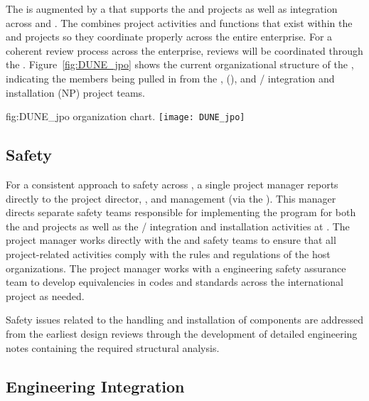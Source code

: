 The  is augmented by a  that supports the
 and  projects as well as integration
across  and . The  
combines project activities and functions that exist within the 
 and  projects so they  
 coordinate properly across the entire enterprise.    
For a coherent review process across the 
 enterprise, reviews will be coordinated 
through the . 
Figure~\ref{fig:DUNE_jpo} shows the current organizational 
structure of the , indicating the members being 
pulled in from the ,  (), and 
/ integration and installation (NP) 
project teams.

\begin{dunefigure}{fig:DUNE_jpo}
  { organization chart.}
  \texttt{[image: DUNE\_jpo]}
\end{dunefigure}


\subsection{Safety}
\label{sec:dune_safety}

For a consistent approach to safety across ,
a single project  manager reports directly 
to the  project director, , and 
management (via the  ).  This manager
directs separate safety teams responsible for implementing the 
  program for both the  
and  projects as well as the /
integration and installation activities at .  The 
project  manager works directly with the  
and  safety teams to ensure that all project-related 
activities comply with the rules and regulations of the host 
organizations.  The project  manager works with a  
engineering safety assurance team to develop
equivalencies in codes and standards across the international project
as needed.

Safety issues related to the handling 
and installation of components are addressed  
from the earliest design reviews through the development 
of detailed engineering notes containing the required
structural analysis.


\subsection{Engineering Integration}
\label{sec:dune_engineering}

